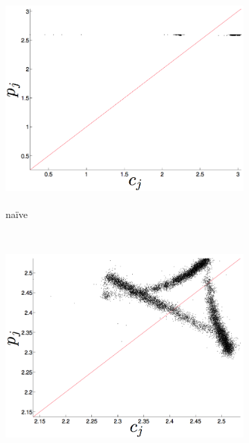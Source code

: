 \begin{figure}[htbp]
\begin{subfigure}{0.6\columnwidth}
    \label{fig:gccMEAN}
  \end{subfigure}%
     \begin{subfigure}{0.6\columnwidth}
    \includegraphics[width=\columnwidth]{figs/svdfiveMeanForecast.png}
    \caption{\svdfive\\ na\"ive }
    \label{fig:gccMEAN}
  \end{subfigure}%
  \\
    \begin{subfigure}{0.6\columnwidth}
    \includegraphics[width=\columnwidth]{figs/colARIMAForecast.png}
    

\end{subfigure}
\end{figure}
